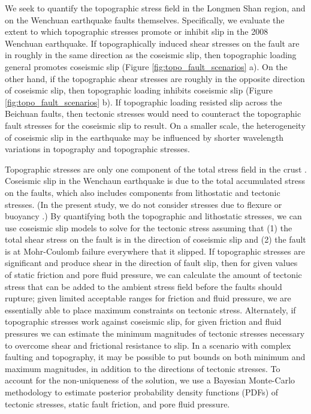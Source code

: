 \documentclass[draft,jgrga]{AGUTeX}
\begin{document}
\begin{article}
We seek to quantify the topographic stress field in the Longmen Shan region,
and on the Wenchuan earthquake faults themselves. Specifically, we evaluate the
extent to which topographic stresses promote or inhibit slip in the 2008
Wenchuan earthquake. If topographically induced shear stresses on the fault are
in roughly in the same direction as the coseismic slip, then topographic
loading general promotes coseismic slip (Figure \ref{fig:topo_fault_scenarios}
a). On the other hand, if the topographic shear stresses are roughly in the
opposite direction of coseismic slip, then topographic loading inhibits
coseismic slip (Figure \ref{fig:topo_fault_scenarios} b). If topographic
loading resisted slip across the Beichuan faults, then tectonic stresses would
need to counteract the topographic fault stresses for the coseismic slip to
result. On a smaller scale, the heterogeneity of coseismic slip in the
earthquake may be influenced by shorter wavelength variations in topography and
topographic stresses.


Topographic stresses are only one component of the total stress field in the
crust \citep{molnar1988}. Coseismic slip in the Wenchaun earthquake is due to
the total accumulated stress on the faults, which also includes components from
lithostatic and tectonic stresses. (In the present study, we do not consider
stresses due to flexure \citep[e.g.,][] {luttrell2007} or buoyancy
\citep[e.g.,][]{luttrell2011}.) By quantifying both the topographic and
lithostatic stresses, we can use coseismic slip models to solve for the
tectonic stress assuming that (1) the total shear stress on the fault is in the
direction of coseismic slip \citep[e.g.,] []{angelier1994} and (2) the fault is
at Mohr-Coulomb failure everywhere that it slipped. If topographic stresses are
significant and produce shear in the direction of fault slip, then for given
values of static friction and pore fluid pressure, we can calculate the amount
of tectonic stress that can be added to the ambient stress field before the
faults should rupture; given limited acceptable ranges for friction and fluid
pressure, we are essentially able to place maximum constraints on tectonic
stress. Alternately, if topographic stresses work against coseismic slip, for
given friction and fluid pressures we can estimate the minimum magnitudes of
tectonic stresses necessary to overcome shear and frictional resistance to
slip. In a scenario with complex faulting and topography, it may be possible to
put bounds on both minimum and maximum magnitudes, in addition to the 
directions of tectonic
stresses. To account for the non-uniqueness of the solution, we use a Bayesian
Monte-Carlo methodology to estimate posterior probability density functions
(PDFs) of tectonic stresses, static fault friction, and pore fluid pressure.


\end{article}
\end{document}
